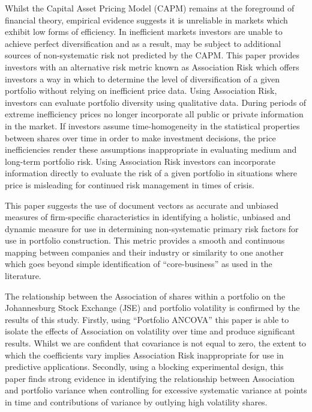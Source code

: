\documentclass[11pt]{article}
\begin{document}
Whilst the Capital Asset Pricing Model (CAPM) remains at the foreground
of financial theory, empirical evidence suggests it is unreliable in
markets which exhibit low forms of efficiency. In inefficient markets
investors are unable to achieve perfect diversification and as a result,
may be subject to additional sources of non-systematic risk not
predicted by the CAPM. This paper provides investors with an alternative
risk metric known as Association Risk which offers investors a way in
which to determine the level of diversification of a given portfolio
without relying on inefficient price data. Using Association Risk,
investors can evaluate portfolio diversity using qualitative data.
During periods of extreme inefficiency prices no longer incorporate all
public or private information in the market. If investors assume
time-homogeneity in the statistical properties between shares over time
in order to make investment decisions, the price inefficiencies render
these assumptions inappropriate in evaluating medium and long-term
portfolio risk. Using Association Risk investors can incorporate
information directly to evaluate the risk of a given portfolio in
situations where price is misleading for continued risk management in
times of crisis.

This paper suggests the use of document vectors as accurate and unbiased
measures of firm-specific characteristics in identifying a holistic,
unbiased and dynamic measure for use in determining non-systematic
primary risk factors for use in portfolio construction. This metric
provides a smooth and continuous mapping between companies and their
industry or similarity to one another which goes beyond simple
identification of ``core-business'' as used in the literature.

The relationship between the Association of shares within a portfolio on
the Johannesburg Stock Exchange (JSE) and portfolio volatility is
confirmed by the results of this study. Firstly, using ``Portfolio
ANCOVA'' this paper is able to isolate the effects of Association on
volatility over time and produce significant results. Whilst we are
confident that covariance is not equal to zero, the extent to which the
coefficients vary implies Association Risk inappropriate for use in
predictive applications. Secondly, using a blocking experimental design,
this paper finds strong evidence in identifying the relationship between
Association and portfolio variance when controlling for excessive
systematic variance at points in time and contributions of variance by
outlying high volatility shares.
\end{document}
